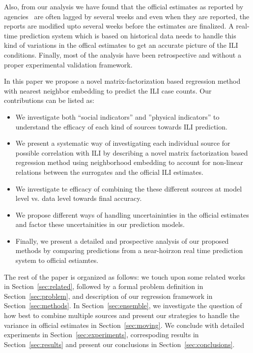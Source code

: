Also, from our analysis we have found that the official estimates as reported by
agencies~\cite{PAHO:2013} are often lagged by several weeks and even when they
are reported, the reports are modified upto several weeks before the estimates 
are finalized. A real-time prediction system which is based on historical data
needs to handle this kind of variations in the offical estimates to get an 
accurate picture of the ILI conditions. Finally, most of the analysis have been 
retrospective and without a proper experimental validation framework.

In this paper we propose a novel matrix-factorization based regression method with 
nearest neighbor embedding to predict the ILI case counts. Our contributions can be listed
as:
\begin{itemize}
  \item We investigate both ``social indicators'' and ''physical indicators'' to 
    understand the efficacy of each kind of sources towards ILI prediction.
  \item We present a systematic way of investigating each individual source for possible 
    correlation with ILI by describing a novel matrix factorization based regression method
    using neighborhood embedding to account for 
    non-linear relations between the surrogates and the official ILI estimates.
  \item We investigate te efficacy of combining the these different sources at model 
    level vs. data level towards final accuracy.
  \item We propose different ways of handling uncertaininties in the official 
    estimates and factor these uncertainities in our prediction models.
  \item Finally, we present a detailed and prospective analysis of our proposed methods
    by comparing predictions from a near-hoirzon real time prediction system to 
    official estiamtes.
\end{itemize}

The rest of the paper is organized as follows: we touch upon some related works in 
Section~\ref{sec:related}, followed by a formal problem definition in Section~\ref{sec:problem},
and description of our regression framework in Section~\ref{sec:methods}. In Section~\ref{sec:ensemble}, 
we investigate the question of how best to combine multiple sources and present our strategies to 
handle the variance in official estimates in Section~\ref{sec:moving}. We conclude with detailed 
experiments in Section~\ref{sec:experiments}, correspoding results in Section~\ref{sec:results} and present
our conclusions in Section~\ref{sec:conclusions}.

